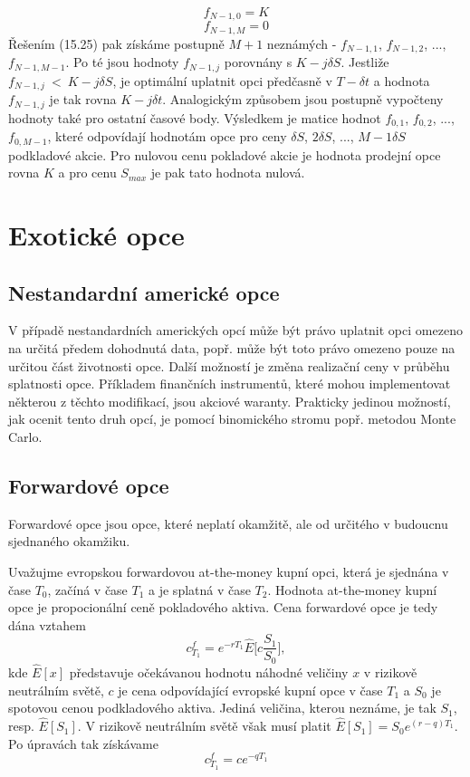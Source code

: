 \documentclass[a4paper]{book}
\begin{document}
\begin{equation*}
f_{N-1,0} = K
\end{equation*}
\begin{equation*}
f_{N-1,M} = 0
\end{equation*}
Řešením (15.25) pak získáme postupně $M+1$ neznámých - $f_{N-1,1}$, $f_{N-1,2}$, ..., $f_{N-1,M-1}$. Po té jsou hodnoty $f_{N-1,j}$ porovnány s $K-j \delta S$. Jestliže $f_{N-1,j}~<~K - j \delta S$, je optimální uplatnit opci předčasně v $T - \delta t$ a hodnota $f_{N-1,j}$ je tak rovna $K - j \delta t$. Analogickým způsobem jsou postupně vypočteny hodnoty také pro ostatní časové body. Výsledkem je matice hodnot $f_{0,1}$, $f_{0,2}$, ..., $f_{0,M-1}$, které odpovídají hodnotám opce pro ceny $\delta S$, $2 \delta S$, ..., $M-1 \delta S$ podkladové akcie. Pro nulovou cenu pokladové akcie je hodnota prodejní opce rovna $K$ a pro cenu $S_{max}$ je pak tato hodnota nulová.

\chapter{Exotické opce}

\section{Nestandardní americké opce}

V případě nestandardních amerických opcí může být právo uplatnit opci omezeno na určitá předem dohodnutá data, popř. může být toto právo omezeno pouze na určitou část životnosti opce. Další možností je změna realizační ceny v průběhu splatnosti opce. Příkladem finančních instrumentů, které mohou implementovat některou z těchto modifikací, jsou akciové waranty. Prakticky jedinou možností, jak ocenit tento druh opcí, je pomocí binomického stromu popř. metodou Monte Carlo.

\section{Forwardové opce}

Forwardové opce jsou opce, které neplatí okamžitě, ale od určitého v budoucnu sjednaného okamžiku.

Uvažujme evropskou forwardovou at-the-money kupní opci, která je sjednána v čase $T_0$, začíná v čase $T_1$ a je splatná v čase $T_2$. Hodnota at-the-money kupní opce je propocionální ceně pokladového aktiva. Cena forwardové opce je tedy dána vztahem
\begin{equation*}
c_{T_1}^f = e^{-rT_1}\hat{E} \Bigg[ c \frac{S_1}{S_0}\Bigg],
\end{equation*}
kde $\hat{E}[x]$ představuje očekávanou hodnotu náhodné veličiny $x$ v rizikově neutrálním světě, $c$ je cena odpovídající evropské kupní opce v čase $T_1$ a $S_0$ je spotovou cenou podkladového aktiva. Jediná veličina, kterou neznáme, je tak $S_1$, resp. $\hat{E}[S_1]$. V rizikově neutrálním světě však musí platit $\hat{E}[S_1] = S_0e^{(r-q)T_1}$. Po úpravách tak získávame
\begin{equation*}
c_{T_1}^f  = ce^{-qT_1}
\end{equation*}
\end{document}
